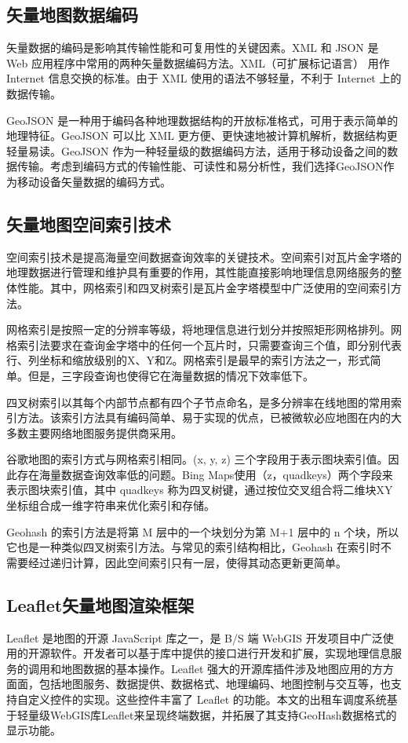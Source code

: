 \subsection{矢量地图数据编码}
矢量数据的编码是影响其传输性能和可复用性的关键因素。XML 和 JSON 是 Web 应用程序中常用的两种矢量数据编码方法。XML（可扩展标记语言） 用作 Internet 信息交换的标准。由于 XML 使用的语法不够轻量，不利于 Internet 上的数据传输。

GeoJSON 是一种用于编码各种地理数据结构的开放标准格式，可用于表示简单的地理特征。GeoJSON 可以比 XML 更方便、更快速地被计算机解析，数据结构更轻量易读。GeoJSON 作为一种轻量级的数据编码方法，适用于移动设备之间的数据传输。考虑到编码方式的传输性能、可读性和易分析性，我们选择GeoJSON作为移动设备矢量数据的编码方式。
\subsection{矢量地图空间索引技术}
空间索引技术是提高海量空间数据查询效率的关键技术。空间索引对瓦片金字塔的地理数据进行管理和维护具有重要的作用，其性能直接影响地理信息网络服务的整体性能。其中，网格索引和四叉树索引是瓦片金字塔模型中广泛使用的空间索引方法。

网格索引是按照一定的分辨率等级，将地理信息进行划分并按照矩形网格排列。网格索引法要求在查询金字塔中的任何一个瓦片时，只需要查询三个值，即分别代表行、列坐标和缩放级别的X、Y和Z。网格索引是最早的索引方法之一，形式简单。但是，三字段查询也使得它在海量数据的情况下效率低下。

四叉树索引以其每个内部节点都有四个子节点命名，是多分辨率在线地图的常用索引方法。该索引方法具有编码简单、易于实现的优点，已被微软必应地图在内的大多数主要网络地图服务提供商采用。

谷歌地图的索引方式与网格索引相同。(x, y, z) 三个字段用于表示图块索引值。因此存在海量数据查询效率低的问题。Bing Maps使用（z，quadkeys）两个字段来表示图块索引值，其中 quadkeys 称为四叉树键，通过按位交叉组合将二维块XY坐标组合成一维字符串来优化索引和存储。

Geohash 的索引方法是将第 M 层中的一个块划分为第 M+1 层中的 n 个块，所以它也是一种类似四叉树索引方法。与常见的索引结构相比，Geohash 在索引时不需要经过递归计算，因此空间索引只有一层，使得其动态更新更简单。

\subsection{Leaflet矢量地图渲染框架}
Leaflet 是地图的开源 JavaScript 库之一，是 B/S 端 WebGIS 开发项目中广泛使用的开源软件。开发者可以基于库中提供的接口进行开发和扩展，实现地理信息服务的调用和地图数据的基本操作。Leaflet 强大的开源库插件涉及地图应用的方方面面，包括地图服务、数据提供、数据格式、地理编码、地图控制与交互等，也支持自定义控件的实现。这些控件丰富了 Leaflet  的功能。本文的出租车调度系统基于轻量级WebGIS库Leaflet来呈现终端数据，并拓展了其支持GeoHash数据格式的显示功能。


